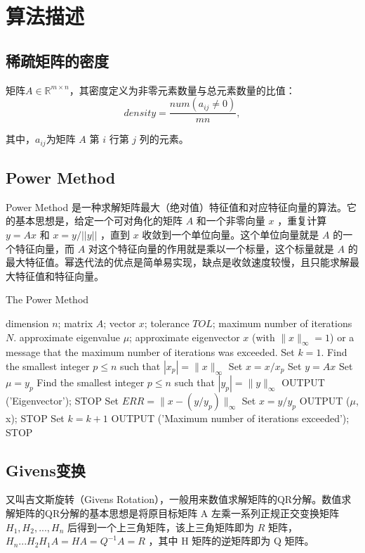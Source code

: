 \documentclass{source/Report}
\begin{document}
\section{算法描述}
\subsection{稀疏矩阵的密度}
矩阵$A\in \mathbb{R} ^{m\times n}$，其密度定义为非零元素数量与总元素数量的比值：
\[density = \dfrac{num(a_{ij}\neq 0)}{mn},\]\par
其中，$a_{ij}$为矩阵 $A$ 第 $i$ 行第 $j$ 列的元素。

\subsection{Power Method}
Power Method 是一种求解矩阵最大（绝对值）特征值和对应特征向量的算法。它的基本思想是，给定一个可对角化的矩阵 $A$ 和一个非零向量 $x$ ，重复计算 $y = Ax$ 和 $x = y / ||y||$ ，直到 $x$ 收敛到一个单位向量。这个单位向量就是 $A$ 的一个特征向量，而 $A$ 对这个特征向量的作用就是乘以一个标量，这个标量就是 $A$ 的最大特征值。幂迭代法的优点是简单易实现，缺点是收敛速度较慢，且只能求解最大特征值和特征向量。
\begin{algorithm}[H]
  \caption{The Power Method}
  \begin{algorithmic}[1]
    \Require dimension $n$; matrix $A$; vector $x$; tolerance $TOL$; maximum number of iterations $N$.
    \Ensure approximate eigenvalue $\mu$; approximate eigenvector $x$ (with $\|x\|_{\infty} = 1$) or a message that the maximum number of iterations was exceeded.
    \State Set $k = 1$.
    \State Find the smallest integer $p \leq n$ such that $|x_p| = \|x\|_\infty$
    \State Set $x = x/x_p$
    \State Set $y = Ax$
    \State Set $\mu = y_p$
    \State Find the smallest integer $p \leq n$ such that $|y_p| = \|y\|_\infty$
    \State OUTPUT ('Eigenvector'); STOP
    \EndIf
    \State Set $ERR = \|x-(y/y_p)\|_{\infty}$
    \State Set $x=y/y_p$
    \State OUTPUT ($\mu$, x); STOP
    \EndIf
    \State Set $k = k + 1$
    \EndWhile
    \State OUTPUT ('Maximum number of iterations exceeded'); STOP
  \end{algorithmic}
\end{algorithm}

\subsection{Givens变换}
又叫吉文斯旋转（Givens Rotation），一般用来数值求解矩阵的QR分解。数值求解矩阵的QR分解的基本思想是将原目标矩阵 A 左乘一系列正规正交变换矩阵 $H_1,H_2,...,H_n$ 后得到一个上三角矩阵，该上三角矩阵即为 $R$ 矩阵， $H_n...H_2H_1A=HA=Q^{-1}A=R$ ，其中 H 矩阵的逆矩阵即为 Q 矩阵。
\end{document}
